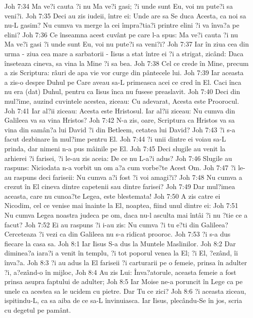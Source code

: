 Joh 7:34  Ma ve?i cauta ?i nu Ma ve?i gasi; ?i unde sunt Eu, voi nu pute?i sa veni?i.
Joh 7:35  Deci au zis iudeii, între ei: Unde are sa Se duca Acesta, ca noi sa nu-L gasim? Nu cumva va merge la cei împra?tia?i printre elini ?i va înva?a pe elini?
Joh 7:36  Ce înseamna acest cuvânt pe care l-a spus: Ma ve?i cauta ?i nu Ma ve?i gasi ?i unde sunt Eu, voi nu pute?i sa veni?i?
Joh 7:37  Iar în ziua cea din urma - ziua cea mare a sarbatorii - Iisus a stat între ei ?i a strigat, zicând: Daca înseteaza cineva, sa vina la Mine ?i sa bea.
Joh 7:38  Cel ce crede în Mine, precum a zis Scriptura: râuri de apa vie vor curge din pântecele lui.
Joh 7:39  Iar aceasta a zis-o despre Duhul pe Care aveau sa-L primeasca acei ce cred în El. Caci înca nu era (dat) Duhul, pentru ca Iisus înca nu fusese preaslavit.
Joh 7:40  Deci din mul?ime, auzind cuvintele acestea, ziceau: Cu adevarat, Acesta este Proorocul.
Joh 7:41  Iar al?ii ziceau: Acesta este Hristosul. Iar al?ii ziceau: Nu cumva din Galileea va sa vina Hristos?
Joh 7:42  N-a zis, oare, Scriptura ca Hristos va sa vina din samân?a lui David ?i din Betleem, cetatea lui David?
Joh 7:43  ?i s-a facut dezbinare în mul?ime pentru El.
Joh 7:44  ?i unii dintre ei voiau sa-L prinda, dar nimeni n-a pus mâinile pe El.
Joh 7:45  Deci slugile au venit la arhierei ?i farisei, ?i le-au zis aceia: De ce nu L-a?i adus?
Joh 7:46  Slugile au raspuns: Niciodata n-a vorbit un om a?a cum vorbe?te Acest Om.
Joh 7:47  ?i le-au raspuns deci fariseii: Nu cumva a?i fost ?i voi amagi?i?
Joh 7:48  Nu cumva a crezut în El cineva dintre capetenii sau dintre farisei?
Joh 7:49  Dar mul?imea aceasta, care nu cunoa?te Legea, este blestemata!
Joh 7:50  A zis catre ei Nicodim, cel ce venise mai înainte la El, noaptea, fiind unul dintre ei:
Joh 7:51  Nu cumva Legea noastra judeca pe om, daca nu-l asculta mai întâi ?i nu ?tie ce a facut?
Joh 7:52  Ei au raspuns ?i i-au zis: Nu cumva ?i tu e?ti din Galileea? Cerceteaza ?i vezi ca din Galileea nu s-a ridicat prooroc.
Joh 7:53  ?i s-a dus fiecare la casa sa.
Joh 8:1  Iar Iisus S-a dus la Muntele Maslinilor.
Joh 8:2  Dar diminea?a iara?i a venit în templu, ?i tot poporul venea la El; ?i El, ?ezând, îi înva?a.
Joh 8:3  ?i au adus la El fariseii ?i carturarii pe o femeie, prinsa în adulter ?i, a?ezând-o în mijloc,
Joh 8:4  Au zis Lui: Înva?atorule, aceasta femeie a fost prinsa asupra faptului de adulter;
Joh 8:5  Iar Moise ne-a poruncit în Lege ca pe unele ca acestea sa le ucidem cu pietre. Dar Tu ce zici?
Joh 8:6  ?i aceasta ziceau, ispitindu-L, ca sa aiba de ce sa-L învinuiasca. Iar Iisus, plecându-Se în jos, scria cu degetul pe pamânt.
